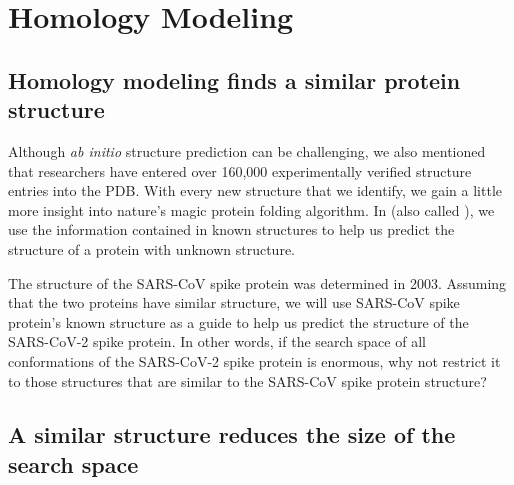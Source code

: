 \begin{qbox}\end{qbox}

\FloatBarrier
{}

\section{Homology Modeling}
\label{sec:homology}
\subsection{Homology modeling finds a similar protein structure}

Although \textit{ab initio} structure prediction can be challenging, we also mentioned that researchers have entered over 160,000 experimentally verified structure entries into the PDB. With every new structure that we identify, we gain a little more insight into nature's magic protein folding algorithm. In  (also called ), we use the information contained in known structures to help us predict the structure of a protein with unknown structure.

The structure of the SARS-CoV spike protein was determined in 2003. Assuming that the two proteins have similar structure, we will use SARS-CoV spike protein's known structure as a guide to help us predict the structure of the SARS-CoV-2 spike protein. In other words, if the search space of all conformations of the SARS-CoV-2 spike protein is enormous, why not restrict it to those structures that are similar to the SARS-CoV spike protein structure?\\

\begin{qbox}\end{qbox}

\subsection{A similar structure reduces the size of the search space}


